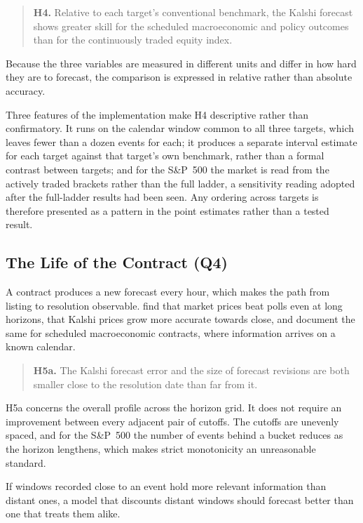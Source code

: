 \documentclass[12pt,a4paper]{report}
\begin{document}
\begin{quote}
\textbf{H4.} Relative to each target's conventional benchmark, the Kalshi
forecast shows greater skill for the scheduled macroeconomic and policy
outcomes than for the continuously traded equity index.
\end{quote}

Because the three variables are measured in different units and differ in how
hard they are to forecast, the comparison is expressed in relative rather than
absolute accuracy.

Three features of the implementation make H4 descriptive
rather than confirmatory. It runs on the calendar window common to all three
targets, which leaves fewer than a dozen events for each; it produces a
separate interval estimate for each target against that target's own
benchmark, rather than a formal contrast between targets; and for the
S\&P~500 the market is read from the actively traded brackets rather than the
full ladder, a sensitivity reading adopted after the full-ladder results had
been seen. Any ordering across targets is therefore presented as a pattern in
the point estimates rather than a tested result.

\subsection{The Life of the Contract (Q4)}

A contract produces a new forecast every hour, which makes the path from
listing to resolution observable. \textcite{berg2008} find that market prices
beat polls even at long horizons, \textcite{burgi2025} that Kalshi prices grow
more accurate towards close, and \textcite{diercks2026} document the same for
scheduled macroeconomic contracts, where information arrives on a known
calendar.

\begin{quote}
\textbf{H5a.} The Kalshi forecast error and the size of forecast revisions are
both smaller close to the resolution date than far from it.
\end{quote}

H5a concerns the overall profile across the horizon grid. It does not require
an improvement between every adjacent pair of cutoffs. The cutoffs are unevenly spaced, and for the S\&P~500 the number of
events behind a bucket reduces as the horizon lengthens, which makes strict
monotonicity an unreasonable standard.

If windows recorded close to an event hold more relevant information than
distant ones, a model that discounts distant windows should forecast better
than one that treats them alike.
\end{document}
